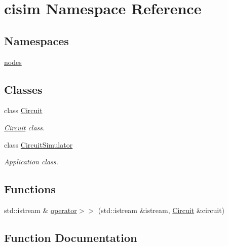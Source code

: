 \hypertarget{namespacecisim}{}\section{cisim Namespace Reference}
\label{namespacecisim}
\subsection*{Namespaces}
\begin{DoxyCompactItemize}
\item 
 \hyperlink{namespacecisim_1_1nodes}{nodes}
\end{DoxyCompactItemize}
\subsection*{Classes}
\begin{DoxyCompactItemize}
\item 
class \hyperlink{classcisim_1_1_circuit}{Circuit}
\begin{DoxyCompactList}\small\item\em \hyperlink{classcisim_1_1_circuit}{Circuit} class. \end{DoxyCompactList}\item 
class \hyperlink{classcisim_1_1_circuit_simulator}{Circuit\+Simulator}
\begin{DoxyCompactList}\small\item\em Application class. \end{DoxyCompactList}\end{DoxyCompactItemize}
\subsection*{Functions}
\begin{DoxyCompactItemize}
\item 
std\+::istream \& \hyperlink{namespacecisim_a9489303a86fdb03e3f7e13762bd748bd}{operator$>$$>$} (std\+::istream \&istream, \hyperlink{classcisim_1_1_circuit}{Circuit} \&circuit)
\end{DoxyCompactItemize}


\subsection{Function Documentation}
